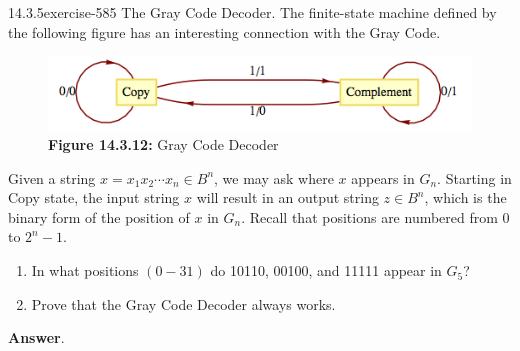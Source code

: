 \documentclass[twoside,10pt,]{book}
\numberwithin{equation}{section}
\begin{document}
\begin{divisionsolution}{14.3.5}{}{exercise-585}%
\hypertarget{p-5233}{}%
The Gray Code Decoder. The finite-state machine defined by the following figure has an interesting connection with the Gray Code.%
\begin{figure}
\centering
\includegraphics[width=0.7\linewidth]{images/fig-gray-code-decoder.png}
\caption*{\textbf{Figure 14.3.12:} Gray Code Decoder}
\end{figure}
\hypertarget{p-5234}{}%
Given a string \(x=x_1x_2\cdots  x_n\in B^n\), we may ask where \(x\) appears in \(G_n\). Starting in Copy state, the input string \(x\) will result in an output string \(z\in B^n\), which is the binary form of the position of \(x\) in \(G_n\).  Recall that positions are numbered from 0 to \(2^n-1\).\leavevmode%
\begin{enumerate}[label=(\alph*)]
\item\hypertarget{li-2380}{}\hypertarget{p-5235}{}%
In what positions \((0-31)\) do 10110, 00100, and 11111 appear in \(G_5\)?%
\item\hypertarget{li-2381}{}\hypertarget{p-5236}{}%
Prove that the Gray Code Decoder always works.%
\end{enumerate}
%
\par\smallskip%
\noindent\textbf{Answer}.\quad%
\hypertarget{p-5237}{}%
\leavevmode%
\end{divisionsolution}
\end{document}
